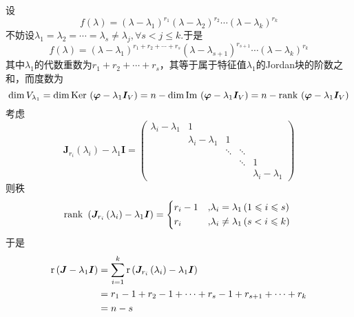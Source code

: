 设\[
    f\left(\lambda\right)=\left(\lambda-\lambda_1\right)^{r_1}\left(\lambda-\lambda_2\right)^{r_2}\cdots\left(\lambda-\lambda_k\right)^{r_k}
\]不妨设$\lambda_1=\lambda_2=\cdots=\lambda_s\neq \lambda_j,\forall s<j\leqslant k.$于是\[
    f\left(\lambda\right)=\left(\lambda-\lambda_1\right)^{r_1+r_2+\cdots+r_s}\left(\lambda-\lambda_{s+1}\right)^{r_{s+1}}\cdots\left(\lambda-\lambda_k\right)^{r_k}
\]其中$\lambda_1$的代数重数为$r_1+r_2+\cdots+r_s$，其等于属于特征值$\lambda_1$的Jordan块的阶数之和，而度数为\[
    \dim V_{\lambda_1}=\dim\operatorname{Ker\,} \left(
    \bm{\varphi}-\lambda_1\bm{I}_V
    \right)=n-\dim\operatorname{Im\,} \left(
    \bm{\varphi}-\lambda_1\bm{I}_V
    \right)=n-\operatorname{rank\,} \left(
    \bm{\varphi}-\lambda_1\bm{I}_V
    \right)
\]考虑\[\bm{J}_{r_i}\left(\lambda_i\right)-\lambda_1\bm{I}=
    \begin{pmatrix}
        \lambda_i-\lambda_1 & 1                   &        &        &                     \\
                            & \lambda_i-\lambda_1 & 1      &                              \\
                            &                     & \ddots & \ddots &                     \\
                            &                     &        & \ddots & 1                   \\
                            &                     &        &        & \lambda_i-\lambda_1
    \end{pmatrix}
\]则秩\[
    \rank \,\left(
    \bm{J}_{r_i}\left(\lambda_i\right)-\lambda_1\bm{I}
    \right)=\begin{cases*}
        r_i-1 & ,$\lambda_i=\lambda_1\left(1\leqslant i\leqslant s\right)$ \\
        r_i   & ,$\lambda_i\neq \lambda_1\left(s<i\leqslant k\right)$
    \end{cases*}
\]于是\begin{align*}
    \mathrm{r} \left(\bm{J}-\lambda_1\bm{I}\right) & =\sum_{i=1}^k\mathrm{r} \left(
    \bm{J}_{r_i}\left(\lambda_i\right)-\lambda_1\bm{I}
    \right)                                                                                 \\
                                             & =r_1-1+r_2-1+\cdots+r_s-1+r_{s+1}+\cdots+r_k \\
                                             & =n-s
\end{align*}
